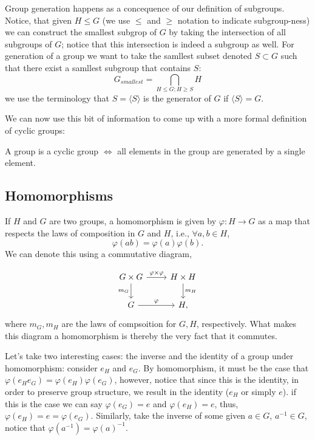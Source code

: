 \documentclass{report}
\begin{document}
\begin{definition}
  Group generation happens as a concequence of our definition of subgroups. Notice, that given \( H \le G \) (we use \( \le\) and \(\ge \) notation to indicate subgroup-ness) we can construct the smallest subgrop of \( G \) by taking the intersection of all subgroups of \( G \); notice that this intersection is indeed a subgroup as well. For generation of a group we want to take the samllest subset denoted \( S \subset G\) such that there exist a samllest subgroup that contains \( S \):
  \begin{displaymath}
    G_{smallest}=\bigcap_{H\le G; H\ge S} H
  \end{displaymath}
  we use the terminology that \( S= \langle S \rangle  \) is the generator of \( G \) if \( \langle S \rangle = G \).
\end{definition}

We can now use this bit of information to come up with a more formal definition of cyclic groups:

\begin{definition}
  A group is a cyclic group \( \iff \) all elements in the group are generated by a single element.
\end{definition}

\subsection{Homomorphisms}
\begin{definition}[Homomorphisms]
  If \( H \) and \( G \) are two groups, a homomorphism is given by \( \varphi : H \to  G \) as a map that respects the laws of composition in \( G \) and \( H \), i.e., \( \forall a,b\in H \),
  \begin{displaymath}
    \varphi (ab)=\varphi (a)\varphi (b).
  \end{displaymath}
  We can denote this using a commutative diagram,

  \[
    \begin{tikzcd}
G \times  G\arrow{r}{\varphi \times  \varphi } \arrow[swap]{d}{m_G} & H \times  H \arrow{d}{m_H} \\%
G \arrow{r}{\varphi}& H,
\end{tikzcd}
\] 
where \( m_G, m_H \) are the laws of compsoition for \( G,H \), respectively. What makes this diagram a homomorphism is thereby the very fact that it commutes. 
\end{definition}

Let's take two interesting cases: the inverse and the identity of a group under homomorphism: consider \( e_H \) and \( e_G \). By homomorphism, it must be the case that \( \varphi (e_He_G)=\varphi (e_H) \varphi (e_G) \), however, notice that since this is the identity, in order to preserve group structure, we result in the identity (\( e_H \) or simply \( e \)). if this is the case we can say \( \varphi (e_G)=e \) and \( \varphi (e_H)=e \), thus, \( \varphi (e_H)=e=\varphi (e_G) \). Similarly, take the inverse of some given \( a \in  G \), \( a^{-1} \in  G \), notice that \( \varphi (a^{-1})=\varphi (a)^{-1} \).
\end{document}

